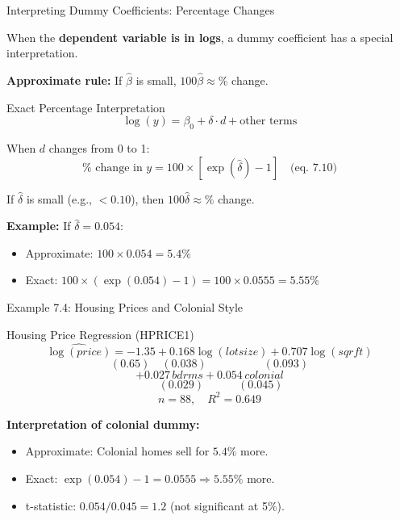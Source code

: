\documentclass[aspectratio=169, 12pt]{beamer}
\begin{document}
\begin{frame}[shrink=20]{Interpreting Dummy Coefficients: Percentage Changes}

  When the \textbf{dependent variable is in logs}, a dummy coefficient has a special interpretation.

  \medskip

  \textbf{Approximate rule:} If $\hat{\beta}$ is small, $100 \hat{\beta} \approx \%$ change.

  \medskip

  \begin{definitionbox}{Exact Percentage Interpretation}
    \[
      \log(y) = \beta_0 + \delta \cdot d + \text{other terms}
    \]

    When $d$ changes from 0 to 1:
    \[
      \% \text{ change in } y = 100 \times \left[ \exp(\hat{\delta}) - 1 \right] \quad \text{(eq.\ 7.10)}
    \]

    If $\hat{\delta}$ is small (e.g., $< 0.10$), then $100 \hat{\delta} \approx \%$ change.
  \end{definitionbox}

  \medskip

  \textbf{Example:} If $\hat{\delta} = 0.054$:
  \begin{itemize}
    \item Approximate: $100 \times 0.054 = 5.4\%$ \\
    \item Exact: $100 \times (\exp(0.054) - 1) = 100 \times 0.0555 = 5.55\%$
  \end{itemize}

\end{frame}

\begin{frame}[shrink=25]{Example 7.4: Housing Prices and Colonial Style}

  \begin{examplebox}{Housing Price Regression (HPRICE1)}
    \[
      \widehat{\log(\textit{price})} = -1.35 + 0.168 \log(\textit{lotsize}) + 0.707 \log(\textit{sqrft})
    \]
    \[
      (0.65) \quad (0.038) \quad\quad\quad\quad\quad (0.093)
    \]
    \[
      + 0.027 \, \textit{bdrms} + 0.054 \, \textit{colonial}
    \]
    \[
      \quad\quad (0.029) \quad\quad\quad (0.045)
    \]
    \[
      n = 88, \quad R^2 = 0.649
    \]
  \end{examplebox}

  \medskip

  \textbf{Interpretation of colonial dummy:}

  \begin{keybox}
    \begin{itemize}
      \item Approximate: Colonial homes sell for $5.4\%$ more.
      \item Exact: $\exp(0.054) - 1 = 0.0555 \Rightarrow 5.55\%$ more.
      \item t-statistic: $0.054 / 0.045 = 1.2$ (not significant at 5\%).
    \end{itemize}
  \end{keybox}

\end{frame}
\end{document}
